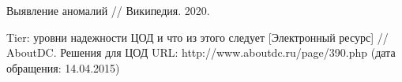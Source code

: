 \begingroup 
\renewcommand{\section}[2]{\newpage\anonsection{Библиографический список}}
\begin{thebibliography}{00}
	
	Выявление аномалий // Википедия. 2020.
	
	Tier: уровни надежности ЦОД и что из этого следует
	[Электронный ресурс] //
	AboutDC. Решения для ЦОД
	URL: http://www.aboutdc.ru/page/390.php
	(дата обращения: 14.04.2015)
	
	
\end{thebibliography}
\endgroup

\clearpage